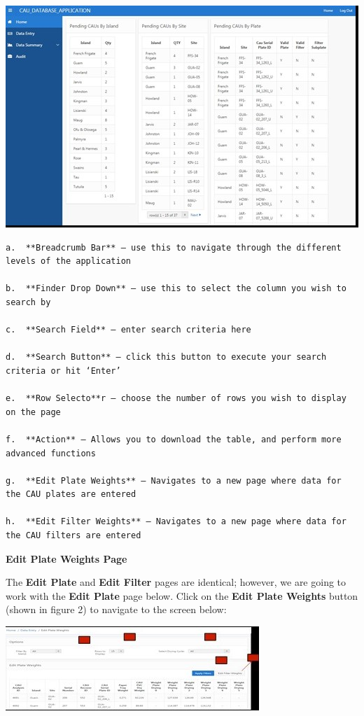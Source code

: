 \documentclass[]{book}
\begin{document}
\includegraphics{images/Data2.jpg}

\begin{verbatim}
a.  **Breadcrumb Bar** – use this to navigate through the different levels of the application  

b.  **Finder Drop Down** – use this to select the column you wish to search by  

c.  **Search Field** – enter search criteria here  

d.  **Search Button** – click this button to execute your search criteria or hit ‘Enter’  

e.  **Row Selecto**r – choose the number of rows you wish to display on the page  

f.  **Action** – Allows you to download the table, and perform more advanced functions  

g.  **Edit Plate Weights** – Navigates to a new page where data for the CAU plates are entered  

h.  **Edit Filter Weights** – Navigates to a new page where data for the CAU filters are entered  
\end{verbatim}

\textbf{Edit Plate Weights Page}

The \textbf{Edit Plate} and \textbf{Edit Filter} pages are identical; however, we are going to work with the \textbf{Edit Plate} page below. Click on the \textbf{Edit Plate Weights} button (shown in figure 2) to navigate to the screen below:

\includegraphics{images/Data3.jpg}
\end{document}
